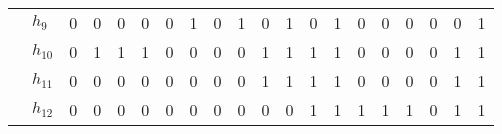 \begin{table*}[tb]
\begin{adjustbox}{width=0.9\textwidth}
\begin{tabular}{cl|cccc cccc cccc cccc | cc}
				&	$h_9$ & 0  & 0 & 0  & 0  & 0 & 1 & 0 & 1  & 0 & 1	 & 0 & 1  & 0 & 0  & 0 & 0 & 0 & 1\\
				&	$h_{10}$   & 0  & 1 & 1  & 1  & 0 & 0 & 0 & 0  & 1 & 1 & 1 & 1  & 0 & 0  & 0 & 0 & 1 & 1\\
				&	$h_{11}$   & 0  & 0 & 0  & 0  & 0 & 0 & 0 & 0  & 1 & 1 & 1 & 1  & 0 & 0  & 0 & 0 & 1 & 1\\
				&	$h_{12}$   & 0  & 0 & 0  & 0  & 0 & 0 & 0 & 0  & 0 & 0 & 1 & 1  & 1 & 1  & 1 & 0 & 1 & 1\\
			\bottomrule
			\end{tabular}
		\end{adjustbox}
\end{table*}


